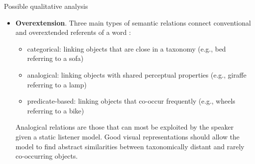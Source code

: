Possible qualitative analysis
\begin{itemize}
\item \textbf{Overextension}. Three main types of semantic relations connect conventional and overextended referents of a word \cite{rescorla1980}:
	\begin{itemize}
	\item categorical: linking objects that are close in a taxonomy (e.g., bed referring to a sofa)
	\item analogical: linking objects with shared perceptual properties (e.g., giraffe referring to a lamp)
	\item predicate-based: linking objects that co-occur frequently (e.g., wheels referring to a bike)
	\end{itemize}
Analogical relations are those that can most be exploited by the speaker given a static listener model. Good visual representations should allow the model to find abstract similarities between taxonomically distant and rarely co-occurring objects. 

\end{itemize}